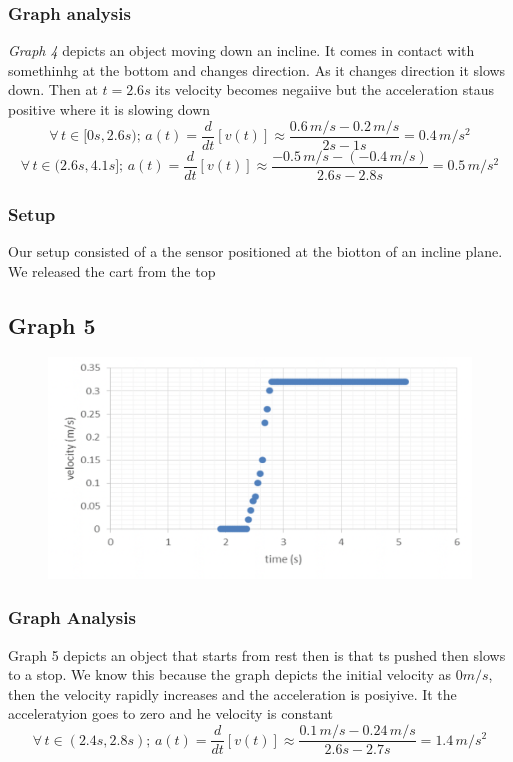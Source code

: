 \documentclass[11pt, letterpaper, includehead]{article}
\begin{document}
  \subsubsection{Graph analysis}
  \emph{Graph 4} depicts an object moving down an incline. It comes in contact with somethinhg at the
  bottom and changes direction. As it changes direction it slows down. Then at $t=2.6s$ its velocity 
  becomes negaiive but the acceleration staus positive where it is slowing down\\
  $$\forall \, t \in [0s, 2.6s); \, a(t) = \frac{d}{dt}[v(t)] \approx \frac{0.6 \, m/s - 0.2 \, m/s}{2s - 1s} = 0.4 \, m/s^2$$
  $$\forall \, t \in (2.6s, 4.1s]; \, a(t) = \frac{d}{dt}[v(t)] \approx \frac{-0.5 \, m/s -(-0.4 \, m/s)}{2.6s - 2.8s} = 0.5 \, m/s^2$$ %
  
  \subsubsection{Setup}
  Our setup consisted of a the sensor positioned at the biotton of an incline plane. We released the cart from the top 

  \subsection{Graph 5}

  \begin{figure}[H] %
    \centering 
    \includegraphics[width=\linewidth]{graph_5.png}
  \end{figure}

  \subsubsection{Graph Analysis}
  Graph 5 depicts an object that starts from rest then is that ts pushed then slows to a stop. 
  We know this because the graph depicts the initial velocity as $0m/s$, then the velocity rapidly 
  increases and the acceleration is posiyive. It the acceleratyion goes to zero and he velocity is constant
  $$\forall \, t \in (2.4s, 2.8s); \, a(t) = \frac{d}{dt}[v(t)] \approx \frac{0.1 \, m/s - 0.24 \, m/s}{2.6s - 2.7s} = 1.4 \, m/s^2$$
\end{document}
